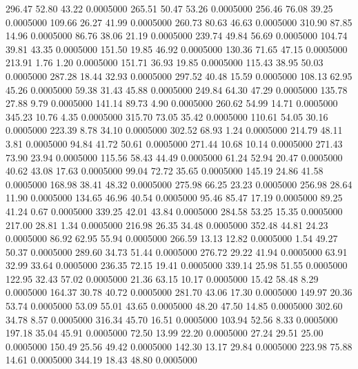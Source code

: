  296.47   52.80   43.22   0.0005000
 265.51   50.47   53.26   0.0005000
 256.46   76.08   39.25   0.0005000
 109.66   26.27   41.99   0.0005000
 260.73   80.63   46.63   0.0005000
 310.90   87.85   14.96   0.0005000
  86.76   38.06   21.19   0.0005000
 239.74   49.84   56.69   0.0005000
 104.74   39.81   43.35   0.0005000
 151.50   19.85   46.92   0.0005000
 130.36   71.65   47.15   0.0005000
 213.91    1.76    1.20   0.0005000
 151.71   36.93   19.85   0.0005000
 115.43   38.95   50.03   0.0005000
 287.28   18.44   32.93   0.0005000
 297.52   40.48   15.59   0.0005000
 108.13   62.95   45.26   0.0005000
  59.38   31.43   45.88   0.0005000
 249.84   64.30   47.29   0.0005000
 135.78   27.88    9.79   0.0005000
 141.14   89.73    4.90   0.0005000
 260.62   54.99   14.71   0.0005000
 345.23   10.76    4.35   0.0005000
 315.70   73.05   35.42   0.0005000
 110.61   54.05   30.16   0.0005000
 223.39    8.78   34.10   0.0005000
 302.52   68.93    1.24   0.0005000
 214.79   48.11    3.81   0.0005000
  94.84   41.72   50.61   0.0005000
 271.44   10.68   10.14   0.0005000
 271.43   73.90   23.94   0.0005000
 115.56   58.43   44.49   0.0005000
  61.24   52.94   20.47   0.0005000
  40.62   43.08   17.63   0.0005000
  99.04   72.72   35.65   0.0005000
 145.19   24.86   41.58   0.0005000
 168.98   38.41   48.32   0.0005000
 275.98   66.25   23.23   0.0005000
 256.98   28.64   11.90   0.0005000
 134.65   46.96   40.54   0.0005000
  95.46   85.47   17.19   0.0005000
  89.25   41.24    0.67   0.0005000
 339.25   42.01   43.84   0.0005000
 284.58   53.25   15.35   0.0005000
 217.00   28.81    1.34   0.0005000
 216.98   26.35   34.48   0.0005000
 352.48   44.81   24.23   0.0005000
  86.92   62.95   55.94   0.0005000
 266.59   13.13   12.82   0.0005000
   1.54   49.27   50.37   0.0005000
 289.60   34.73   51.44   0.0005000
 276.72   29.22   41.94   0.0005000
  63.91   32.99   33.64   0.0005000
 236.35   72.15   19.41   0.0005000
 339.14   25.98   51.55   0.0005000
 122.95   32.43   57.02   0.0005000
  21.36   63.15   10.17   0.0005000
  15.42   58.48    8.29   0.0005000
 164.37   30.78   40.72   0.0005000
 281.70   43.06   17.30   0.0005000
 149.97   20.36   53.74   0.0005000
  53.09   55.01   43.65   0.0005000
  48.20   47.50   14.85   0.0005000
 302.60   34.78    8.57   0.0005000
 316.34   45.70   16.51   0.0005000
 103.94   52.56    8.33   0.0005000
 197.18   35.04   45.91   0.0005000
  72.50   13.99   22.20   0.0005000
  27.24   29.51   25.00   0.0005000
 150.49   25.56   49.42   0.0005000
 142.30   13.17   29.84   0.0005000
 223.98   75.88   14.61   0.0005000
 344.19   18.43   48.80   0.0005000
